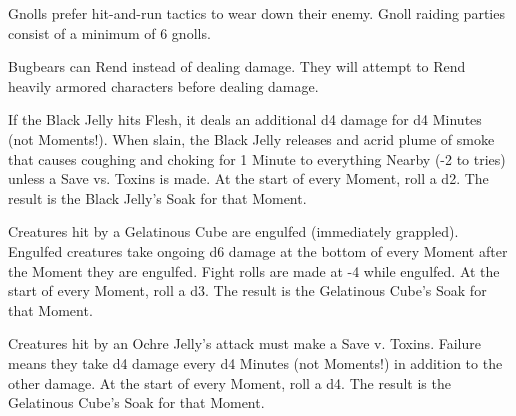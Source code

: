{Gnolls prefer hit-and-run tactics to wear down their enemy.  Gnoll raiding parties consist of a minimum of 6 gnolls.

\MONSTERBLOCK[
  Name=Bugbear,
  Link=monster-bugbear,
  MV=Base,
  WK=d20,
  DMG=d10 1 Close,
  HD=3,
  Power=Strong,
  Soak=0,
  Morale=Fanatical,
  Save=2,
  Extras={Bloodthirsty}
]
 
Bugbears can Rend instead of dealing damage.  They will attempt to Rend heavily armored characters before dealing damage.

\newpage



\MONSTERBLOCK[
  Name=Green Slime,
  Link=monster-green-slime,
  MV=n/a,
  WK=d20,
  DMG=d6 1 Close,
  HD=2,
  Power=Average,
  Soak=1,
  Morale=n/a,
  Save=2,
  Extras={Splitting}
]

\MONSTERBLOCK[
  Name=Black Jelly,
  Link=monster-black-jelly,
  MV=n/a,
  WK=d20,
  DMG=2d4 1 Close,
  HD=3,
  Power=Average,
  Soak=varies,
  Morale=n/a,
  Save=2,
  Extras={Acidic}
]

If the Black Jelly hits Flesh, it deals an additional d4 damage for d4 Minutes (not Moments!).  When slain, the Black Jelly releases and acrid plume of smoke that causes coughing and choking for 1 Minute to everything Nearby (-2 to \RO tries) unless a Save vs. Toxins is made.
At the start of every Moment, roll a d2.  The result is the Black Jelly's Soak for that Moment.

\MONSTERBLOCK[
  Name=Gelatinous Cube,
  Link=monster-gelatinous-cube,
  MV=Slow,
  WK=d16,
  DMG=d10 All Close,
  HD=4,
  Power=Average,
  Soak=varies,
  Morale=n/a,
  Save=3,
  Extras={}
]
Creatures hit by a Gelatinous Cube are engulfed (immediately grappled).  Engulfed creatures take ongoing d6 damage at the bottom of every Moment after the Moment they are engulfed.  Fight \RO rolls are made at -4 while engulfed.
At the start of every Moment, roll a d3.  The result is the Gelatinous Cube's Soak for that Moment.

\MONSTERBLOCK[
  Name=Ochre Jelly,
  Link=monster-ochre-jelly,
  MV=n/a,
  WK=d16,
  DMG=d12 3 Nearby,
  HD=5,
  Power=Average,
  Soak=varies,
  Morale=n/a,
  Save=3,
  Extras={}
]
Creatures hit by an Ochre Jelly's attack must make a Save v. Toxins.  Failure means they take d4 damage every d4 Minutes (not Moments!) in addition to the other damage.
At the start of every Moment, roll a d4.  The result is the Gelatinous Cube's Soak for that Moment.

}
